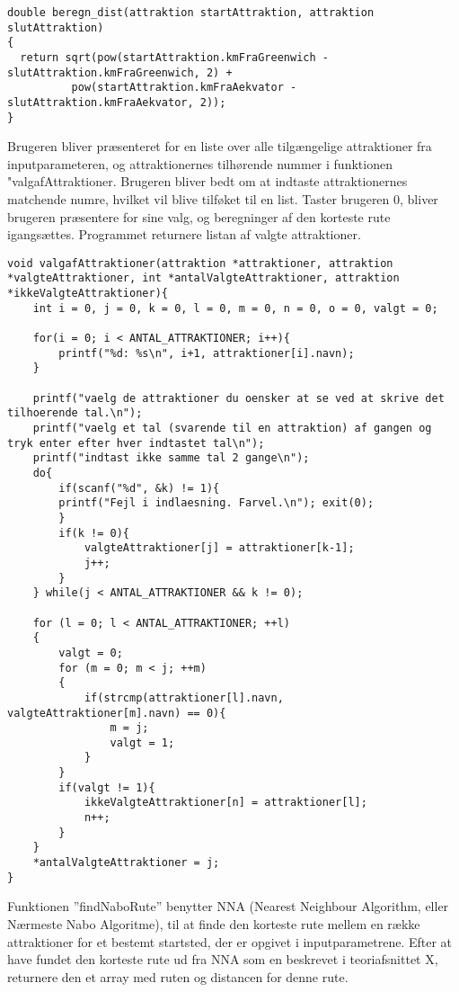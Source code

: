 \begin{lstlisting}
double beregn_dist(attraktion startAttraktion, attraktion slutAttraktion)
{
  return sqrt(pow(startAttraktion.kmFraGreenwich - slutAttraktion.kmFraGreenwich, 2) + 
          pow(startAttraktion.kmFraAekvator - slutAttraktion.kmFraAekvator, 2));
}
\end{lstlisting}

Brugeren bliver præsenteret for en liste over alle tilgængelige attraktioner fra inputparameteren, og attraktionernes tilhørende nummer i funktionen "valgafAttraktioner. Brugeren bliver bedt om at indtaste attraktionernes matchende numre, hvilket vil blive tilføket til en list. Taster brugeren 0, bliver brugeren præsentere for sine valg, og beregninger af den korteste rute igangsættes. Programmet returnere listan af valgte attraktioner. \newline

\begin{lstlisting}
void valgafAttraktioner(attraktion *attraktioner, attraktion *valgteAttraktioner, int *antalValgteAttraktioner, attraktion *ikkeValgteAttraktioner){
	int i = 0, j = 0, k = 0, l = 0, m = 0, n = 0, o = 0, valgt = 0;
	
	for(i = 0; i < ANTAL_ATTRAKTIONER; i++){
		printf("%d: %s\n", i+1, attraktioner[i].navn);
	}
	
	printf("vaelg de attraktioner du oensker at se ved at skrive det tilhoerende tal.\n");
	printf("vaelg et tal (svarende til en attraktion) af gangen og tryk enter efter hver indtastet tal\n");
	printf("indtast ikke samme tal 2 gange\n");
	do{
		if(scanf("%d", &k) != 1){
		printf("Fejl i indlaesning. Farvel.\n"); exit(0);
		}
		if(k != 0){
			valgteAttraktioner[j] = attraktioner[k-1];
			j++;
		}
	} while(j < ANTAL_ATTRAKTIONER && k != 0);
	
	for (l = 0; l < ANTAL_ATTRAKTIONER; ++l)
	{
		valgt = 0;
		for (m = 0; m < j; ++m)
		{
			if(strcmp(attraktioner[l].navn, valgteAttraktioner[m].navn) == 0){
				m = j;
				valgt = 1;
			}	
		}
		if(valgt != 1){
			ikkeValgteAttraktioner[n] = attraktioner[l];
			n++;
		}
	}
	*antalValgteAttraktioner = j;
}
\end{lstlisting}
	
Funktionen ”findNaboRute” benytter NNA (Nearest Neighbour Algorithm, eller Nærmeste Nabo Algoritme), til at finde den korteste rute mellem en række attraktioner for et bestemt startsted, der er opgivet i inputparametrene. Efter at have fundet den korteste rute ud fra NNA som en beskrevet i teoriafsnittet X, returnere den et array med ruten og distancen for denne rute. \newline

